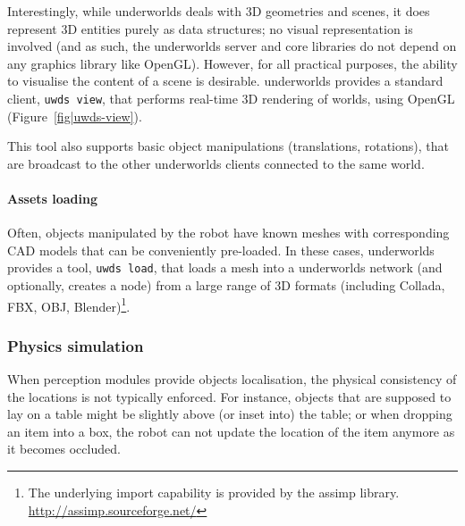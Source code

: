 \documentclass[letterpaper, 10pt, conference]{ieeeconf}
\newcommand{\eg}{e.g.,\xspace}
\newcommand{\uwds}{{\sc underworlds}\xspace}
\begin{document}
Interestingly, while \uwds deals with 3D geometries and scenes, it does
represent 3D entities purely as data structures; no visual representation is
involved (and as such, the \uwds server and core libraries do not depend on any
graphics library like OpenGL). However, for all practical purposes, the ability
to visualise the content of a scene is desirable. \uwds provides a standard
client, {\tt uwds view}, that performs real-time 3D rendering of worlds,
using OpenGL (Figure~\ref{fig|uwds-view}).

This tool also supports basic object manipulations (translations, rotations),
that are broadcast to the other \uwds clients connected to the same world.

\paragraph*{Assets loading}


Often, objects manipulated by the robot have known meshes with corresponding CAD
models that can be conveniently pre-loaded. In these cases, \uwds provides a
tool, {\tt uwds load}, that loads a mesh into a \uwds network (and optionally,
creates a node) from a large range of 3D formats (including Collada, FBX, OBJ,
Blender)\footnote{The underlying import
capability is provided by the {\sc assimp} library.
\url{http://assimp.sourceforge.net/}}.

\subsubsection{Physics simulation}\label{physics}

When perception modules provide objects localisation, the physical consistency
of the locations is not typically enforced. For instance, objects that are
supposed to lay on a table might be slightly above (or inset into) the table; or
when dropping an item into a box, the robot can not update the location of the
item anymore as it becomes occluded.
\end{document}
